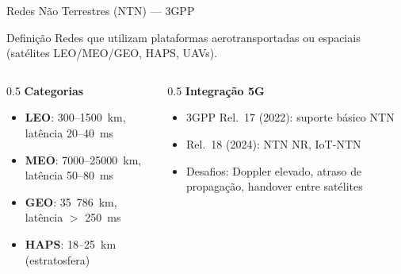 \documentclass[aspectratio=169,11pt]{beamer}
\begin{document}
\begin{frame}{Redes Não Terrestres (NTN) --- 3GPP}
  \begin{block}{Definição}
    Redes que utilizam plataformas aerotransportadas ou espaciais (satélites LEO/MEO/GEO, HAPS, UAVs).
  \end{block}
  \begin{columns}
    \begin{column}{0.5\textwidth}
      \textbf{Categorias}
      \begin{itemize}
        \item \textbf{LEO}: 300--1500~km, latência 20--40~ms
        \item \textbf{MEO}: 7000--25000~km, latência 50--80~ms
        \item \textbf{GEO}: 35~786~km, latência $>$ 250~ms
        \item \textbf{HAPS}: 18--25~km (estratosfera)
      \end{itemize}
    \end{column}
    \begin{column}{0.5\textwidth}
      \textbf{Integração 5G}
      \begin{itemize}
        \item 3GPP Rel.\ 17 (2022): suporte básico NTN
        \item Rel.\ 18 (2024): NTN NR, IoT-NTN
        \item Desafios: Doppler elevado, atraso de propagação, handover entre satélites
      \end{itemize}
    \end{column}
  \end{columns}
\end{frame}
\end{document}
